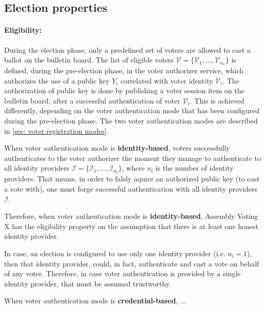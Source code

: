 \subsection{Election properties} \label{sec: election properties}


\paragraph{Eligibility:}
During the election phase, only a predefined set of voters are allowed to cast a ballot on the bulletin board. The list of eligible voters $\boldsymbol{\mathcal{V}} = \{ \mathcal{V}_1, ..., \mathcal{V}_{n_\mathrm{v}} \}$ is defined, during the pre-election phase, in the voter authorizer service, which authorizes the use of a public key $Y_i$ correlated with voter identity $\mathcal{V}_i$. The authorization of public key is done by publishing a voter session item on the bulletin board, after a successful authentication of voter $\mathcal{V}_i$. This is achieved differently, depending on the voter authentication mode that has been configured during the pre-election phase. The two voter authentication modes are described in \cref{sec: voter registration modes}.

When voter authentication mode is \textbf{identity-based}, voters successfully authenticates to the voter authorizer the moment they manage to authenticate to all identity providers $\boldsymbol{\mathcal{I}} = \{ \mathcal{I}_1, ..., \mathcal{I}_{n_\mathrm{i}} \}$, where $n_\mathrm{i}$ is the number of identity providers. That means, in order to falsly aquire an authorized public key (to cast a vote with), one must forge successful authentication with all identity providers $\boldsymbol{\mathcal{I}}$.

Therefore, when voter authentication mode is \textbf{identity-based}, Assembly Voting X has the eligibility property on the assumption that there is at least one honest identity provider.

In case, an election is configured to use only one identity provider (i.e. $n_\mathrm{i} = 1$), then that identity provider, could, in fact, authenticate and cast a vote on behalf of any voter. Therefore, in case voter authentication is provided by a single identity provider, that must be assumed trustworthy.

When voter authentication mode is \textbf{credential-based}, ...


